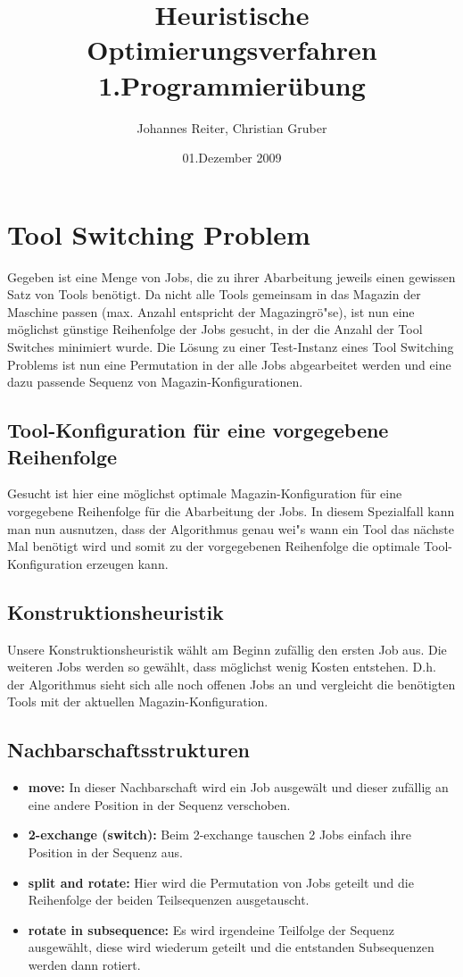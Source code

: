 \documentclass[a4paper,10pt]{article}
\title{Heuristische Optimierungsverfahren \\ \bigskip \textbf{1.Programmier\"{u}bung}}
\author{Johannes Reiter, Christian Gruber}
\date{01.Dezember 2009}
\begin{document}
\maketitle

\section{Tool Switching Problem}
Gegeben ist eine Menge von Jobs, die zu ihrer Abarbeitung jeweils einen gewissen Satz von Tools ben\"{o}tigt.
Da nicht alle Tools gemeinsam in das Magazin der Maschine passen (max. Anzahl entspricht der Magazingr\"{o}"se), ist
nun eine m\"{o}glichst g\"{u}nstige Reihenfolge der Jobs gesucht, in der die Anzahl der Tool Switches minimiert wurde.
Die L\"{o}sung zu einer Test-Instanz eines Tool Switching Problems ist nun eine Permutation in der alle Jobs abgearbeitet
werden und eine dazu passende Sequenz von Magazin-Konfigurationen.

\subsection{Tool-Konfiguration f\"{u}r eine vorgegebene Reihenfolge}
Gesucht ist hier eine m\"{o}glichst optimale Magazin-Konfiguration f\"{u}r eine vorgegebene Reihenfolge f\"{u}r die Abarbeitung der Jobs. In diesem Spezialfall kann man nun ausnutzen, dass der Algorithmus genau wei"s wann ein Tool das n\"{a}chste Mal ben\"{o}tigt wird und somit zu der vorgegebenen Reihenfolge die optimale Tool-Konfiguration erzeugen kann.

\subsection{Konstruktionsheuristik}
Unsere Konstruktionsheuristik w\"{a}hlt am Beginn zuf\"{a}llig den ersten Job aus. Die weiteren Jobs werden so gew\"{a}hlt, dass m\"{o}glichst wenig Kosten entstehen. D.h. der Algorithmus sieht sich alle noch offenen Jobs an und vergleicht die ben\"{o}tigten Tools mit der aktuellen Magazin-Konfiguration.

\subsection{Nachbarschaftsstrukturen}
\begin{itemize}
	\item \textbf{move:} In dieser Nachbarschaft wird ein Job ausgew\"{a}lt und dieser zuf\"{a}llig an eine andere Position in der Sequenz verschoben. 
	\item \textbf{2-exchange (switch):} Beim 2-exchange tauschen 2 Jobs einfach ihre Position in der Sequenz aus.
	\item \textbf{split and rotate:} Hier wird die Permutation von Jobs geteilt und die Reihenfolge der beiden Teilsequenzen ausgetauscht.
	\item \textbf{rotate in subsequence:} Es wird irgendeine Teilfolge der Sequenz ausgew\"{a}hlt, diese wird wiederum geteilt und die entstanden Subsequenzen werden dann rotiert.
\end{itemize}
\end{document}
